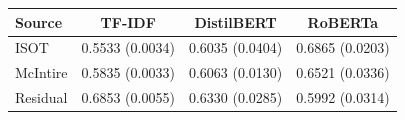 \begin{tabular}{@{}lccc@{}}
\toprule
Source & TF-IDF & DistilBERT & RoBERTa\\
\midrule
ISOT & 0.5533 (0.0034) & 0.6035 (0.0404) & 0.6865 (0.0203)\\
McIntire & 0.5835 (0.0033) & 0.6063 (0.0130) & 0.6521 (0.0336)\\
Residual & 0.6853 (0.0055) & 0.6330 (0.0285) & 0.5992 (0.0314)\\
\bottomrule
\end{tabular}
